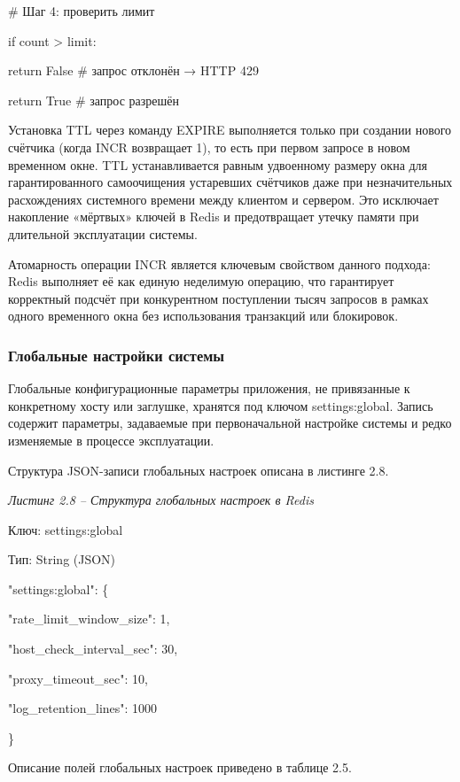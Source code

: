 \documentclass[
]{article}
\begin{document}
\# Шаг 4: проверить лимит

if count \textgreater{} limit:

return False \# запрос отклонён → HTTP 429

return True \# запрос разрешён

Установка TTL через команду EXPIRE выполняется только при создании
нового счётчика (когда INCR возвращает 1), то есть при первом запросе в
новом временном окне. TTL устанавливается равным удвоенному размеру окна
для гарантированного самоочищения устаревших счётчиков даже при
незначительных расхождениях системного времени между клиентом и
сервером. Это исключает накопление «мёртвых» ключей в Redis и
предотвращает утечку памяти при длительной эксплуатации системы.

Атомарность операции INCR является ключевым свойством данного подхода:
Redis выполняет её как единую неделимую операцию, что гарантирует
корректный подсчёт при конкурентном поступлении тысяч запросов в рамках
одного временного окна без использования транзакций или блокировок.

\subsubsection{Глобальные настройки
системы}\label{ux433ux43bux43eux431ux430ux43bux44cux43dux44bux435-ux43dux430ux441ux442ux440ux43eux439ux43aux438-ux441ux438ux441ux442ux435ux43cux44b}

Глобальные конфигурационные параметры приложения, не привязанные к
конкретному хосту или заглушке, хранятся под ключом settings:global.
Запись содержит параметры, задаваемые при первоначальной настройке
системы и редко изменяемые в процессе эксплуатации.

Структура JSON-записи глобальных настроек описана в листинге 2.8.

\emph{Листинг 2.8 -- Структура глобальных настроек в Redis}

Ключ: settings:global

Тип: String (JSON)

"settings:global": \{

"rate\_limit\_window\_size": 1,

"host\_check\_interval\_sec": 30,

"proxy\_timeout\_sec": 10,

"log\_retention\_lines": 1000

\}

Описание полей глобальных настроек приведено в таблице 2.5.
\end{document}
